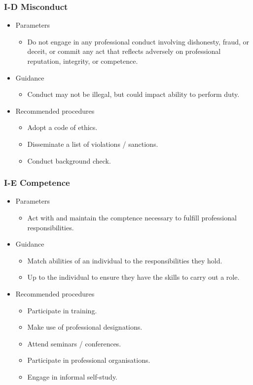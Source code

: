 \documentclass[../notes_compiled.tex]{subfiles}
\begin{document}
\subsubsection{I-D Misconduct}
\begin{itemize}
\item Parameters
\begin{itemize}
\item Do not engage in any professional conduct involving dishonesty, fraud, or deceit, or commit any act that reflects adversely on professional reputation, integrity, or competence.
\end{itemize}
\item Guidance
\begin{itemize}
\item Conduct may not be illegal, but could impact ability to perform duty.
\end{itemize}
\item Recommended procedures
\begin{itemize}
\item Adopt a code of ethics.
\item Disseminate a list of violations / sanctions.
\item Conduct background check.
\end{itemize}
\end{itemize}
\subsubsection{I-E Competence}
\begin{itemize}
\item Parameters
\begin{itemize}
\item Act with and maintain the comptence necessary to fulfill professional responsibilities.
\end{itemize}
\item Guidance
\begin{itemize}
\item Match abilities of an individual to the responsibilities they hold.
\item Up to the individual to ensure they have the skills to carry out a role.
\end{itemize}
\item Recommended procedures
\begin{itemize}
\item Participate in training.
\item Make use of professional designations.
\item Attend seminars / conferences.
\item Participate in professional organisations.
\item Engage in informal self-study.
\end{itemize}
\end{itemize}
\end{document}
